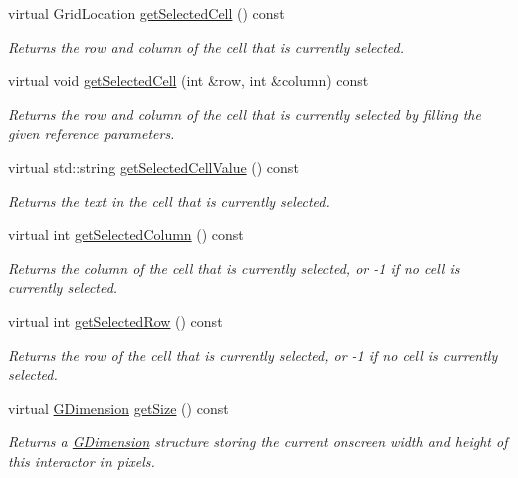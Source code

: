 \begin{DoxyCompactItemize}
virtual Grid\+Location \mbox{\hyperlink{classGTable_ae4b79399eefc964f783f06b6959a6a4a}{get\+Selected\+Cell}} () const
\begin{DoxyCompactList}\small\item\em Returns the row and column of the cell that is currently selected. \end{DoxyCompactList}\item 
virtual void \mbox{\hyperlink{classGTable_a29b4e2e079037922545996e08f7ce6c4}{get\+Selected\+Cell}} (int \&row, int \&column) const
\begin{DoxyCompactList}\small\item\em Returns the row and column of the cell that is currently selected by filling the given reference parameters. \end{DoxyCompactList}\item 
virtual std\+::string \mbox{\hyperlink{classGTable_a8963c035a687a8393cd1f56ae05f582e}{get\+Selected\+Cell\+Value}} () const
\begin{DoxyCompactList}\small\item\em Returns the text in the cell that is currently selected. \end{DoxyCompactList}\item 
virtual int \mbox{\hyperlink{classGTable_abeec6fda3c331aa187ba1b695b19d435}{get\+Selected\+Column}} () const
\begin{DoxyCompactList}\small\item\em Returns the column of the cell that is currently selected, or -\/1 if no cell is currently selected. \end{DoxyCompactList}\item 
virtual int \mbox{\hyperlink{classGTable_adeb0b39683825191a8216d6cc3ca5072}{get\+Selected\+Row}} () const
\begin{DoxyCompactList}\small\item\em Returns the row of the cell that is currently selected, or -\/1 if no cell is currently selected. \end{DoxyCompactList}\item 
virtual \mbox{\hyperlink{structGDimension}{G\+Dimension}} \mbox{\hyperlink{classGInteractor_a7b4eec96a2bdc6420695d5796a78eea9}{get\+Size}} () const
\begin{DoxyCompactList}\small\item\em Returns a \mbox{\hyperlink{structGDimension}{G\+Dimension}} structure storing the current onscreen width and height of this interactor in pixels. \end{DoxyCompactList}\item 

\end{DoxyCompactItemize}
